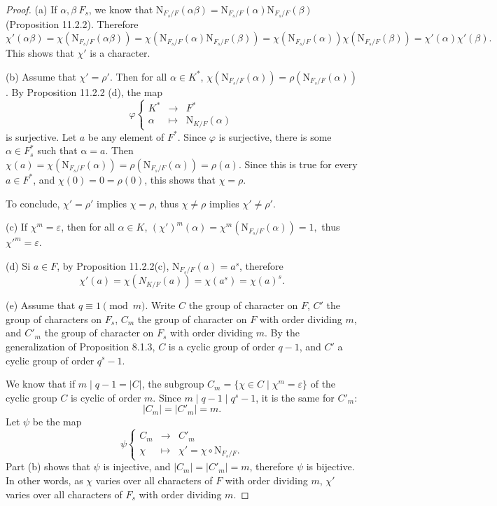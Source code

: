 \documentclass[11pt,a4paper]{article}
\begin{document}
\begin{proof}
\item[(a)] If $\alpha,\beta \ F_s$, we know that $\mathrm{N}_{F_s/F}(\alpha \beta) = \mathrm{N}_{F_s/F}(\alpha) \mathrm{N}_{F_s/F}(\beta)$ (Proposition 11.2.2). Therefore
$$\chi'(\alpha \beta) =\chi(\mathrm{N}_{F_s/F}(\alpha \beta)) =  \chi(\mathrm{N}_{F_s/F}(\alpha) \mathrm{N}_{F_s/F}(\beta)) = \chi(\mathrm{N}_{F_s/F}(\alpha))\chi(\mathrm{N}_{F_s/F}(\beta)) = \chi'(\alpha) \chi'(\beta).$$
This shows that $\chi'$ is a character.

\item[(b)] Assume that $\chi' = \rho'$. Then for all $\alpha \in K^*$, $\chi(\mathrm{N}_{F_s/F}(\alpha)) =\rho(\mathrm{N}_{F_s/F}(\alpha))$.
By Proposition 11.2.2 (d), the map
$$\varphi
\left\{
\begin{array}{ccl}
K^* & \to & F^*\\
\alpha & \mapsto & \mathrm{N}_{K/F}(\alpha)
\end{array}
\right.
$$
is surjective. Let $a$ be any element of $F^*$. Since $\varphi$ is surjective, there is some $\alpha \in F_s^*$ such that $\mathrm{\alpha} = a$.
Then $\chi(a) = \chi(\mathrm{N}_{F_s/F}(\alpha)) =\rho(\mathrm{N}_{F_s/F}(\alpha)) = \rho(a)$. Since this is true for every $a \in F^*$, and $\chi(0) = 0 = \rho(0)$, this shows that $\chi = \rho$. 

To conclude, $\chi' = \rho'$ implies $\chi = \rho$, thus $\chi \ne \rho$ implies $\chi' \ne \rho'$.

\item[(c)] If $\chi^m = \varepsilon$, then for all $\alpha \in K$, 
$(\chi')^m(\alpha) = \chi^m(\mathrm{N}_{F_s/F}(\alpha)) = 1,$
thus $\chi'^m = \varepsilon$.

\item[(d)] Si $a \in F$, by Proposition 11.2.2(c), $\mathrm{N}_{F_s/F}(a) = a^s$, therefore
$$
\chi'(a) = \chi(N_{K/F}(a))= \chi(a^s)= \chi(a)^s.
$$

\item[(e)] Assume that $q \equiv 1 \pmod m$. Write $C$ the group of character on $F$, $C'$ the group of characters on $F_s$, $C_m$ the group of character on $F$ with order dividing $m$, and $C'_m$ the group of character on $F_s$ with order dividing $m$. By the generalization of Proposition 8.1.3, $C$ is a cyclic group of order $q-1$, and $C'$ a cyclic group of order $q^s -1$. 

We know that if $m \mid q-1 = |C|$, the subgroup $C_ m = \{\chi \in C \mid \chi^m = \varepsilon\}$ of the cyclic group $C$ is cyclic of order $m$. Since $m \mid q- 1 \mid q^s - 1$, it is the same for $C'_m$:
$$|C_m |= |C'_m| = m.$$
Let $\psi$ be the map
$$
\psi
\left\{
\begin{array}{ccl}
C_m & \to & C'_m\\
\chi & \mapsto & \chi' =  \chi \circ \mathrm{N}_{F_s/F}.
\end{array}
\right.
$$
Part (b) shows that $\psi$ is injective, and $|C_m| = |C'_m| = m$, therefore $\psi$ is bijective. In other words, as $\chi$ varies over all characters of $F$ with order dividing $m$, $\chi'$ varies over all characters of $F_s$ with order dividing $m$. 
\end{proof}
\end{document}
